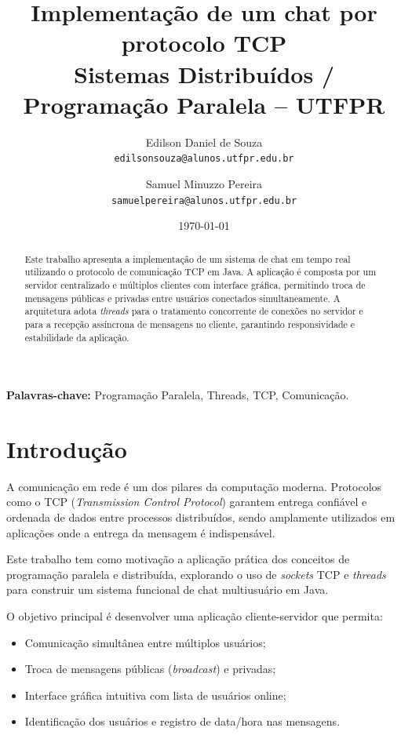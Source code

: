 \documentclass[10pt,twocolumn,a4paper]{article}
\title{\textbf{Implementação de um chat por protocolo TCP}\\
\large Sistemas Distribuídos / Programação Paralela -- UTFPR}
\author{
    Edilson Daniel de Souza \\
    \texttt{edilsonsouza@alunos.utfpr.edu.br}
    \and
    Samuel Minuzzo Pereira \\
    \texttt{samuelpereira@alunos.utfpr.edu.br}
}
\date{\today}
\begin{document}
\maketitle

\begin{abstract}
Este trabalho apresenta a implementação de um sistema de chat em tempo real
utilizando o protocolo de comunicação TCP em Java. A aplicação é composta por
um servidor centralizado e múltiplos clientes com interface gráfica, permitindo
troca de mensagens públicas e privadas entre usuários conectados
simultaneamente. A arquitetura adota \textit{threads} para o tratamento
concorrente de conexões no servidor e para a recepção assíncrona de mensagens
no cliente, garantindo responsividade e estabilidade da aplicação.
\end{abstract}

\textbf{Palavras-chave:} Programação Paralela, Threads, TCP, Comunicação.


\section{Introdução}
A comunicação em rede é um dos pilares da computação moderna. Protocolos como
o TCP (\textit{Transmission Control Protocol}) garantem entrega confiável e
ordenada de dados entre processos distribuídos, sendo amplamente utilizados em
aplicações onde a entrega da mensagem é indispensável.

Este trabalho tem como motivação a aplicação prática dos conceitos de
programação paralela e distribuída, explorando o uso de \textit{sockets} TCP e
\textit{threads} para construir um sistema funcional de chat multiusuário em
Java.

O objetivo principal é desenvolver uma aplicação cliente-servidor que permita:
\begin{itemize}
    \item Comunicação simultânea entre múltiplos usuários;
    \item Troca de mensagens públicas (\textit{broadcast}) e privadas;
    \item Interface gráfica intuitiva com lista de usuários online;
    \item Identificação dos usuários e registro de data/hora nas mensagens.
\end{itemize}

\end{document}
